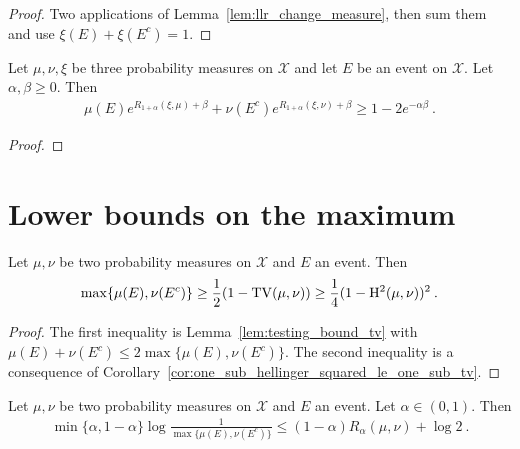 \begin{proof}
Two applications of Lemma~\ref{lem:llr_change_measure}, then sum them and use $\xi(E)+\xi(E^c) = 1$.
\end{proof}

\begin{lemma}
  \label{lem:renyi_change_measure_add}
  Let $\mu, \nu, \xi$ be three probability measures on $\mathcal X$ and let $E$ be an event on $\mathcal X$. Let $\alpha, \beta \ge 0$. Then
  \begin{align*}
  \mu(E) e^{R_{1+\alpha}(\xi, \mu) + \beta} + \nu(E^c) e^{R_{1+\alpha}(\xi, \nu) + \beta} \ge 1 - 2 e^{-\alpha \beta} \: .
  \end{align*}
\end{lemma}

\begin{proof}
\end{proof}


\section{Lower bounds on the maximum}

\begin{lemma}
  \label{lem:testing_bound_tv_hellinger_max}
  Let $\mu, \nu$ be two probability measures on $\mathcal X$ and $E$ an event. Then
  \begin{align*}
  \max\{\mu(E), \nu(E^c)\}
  \ge \frac{1}{2}(1 - \operatorname{TV}(\mu, \nu))
  \ge \frac{1}{4}(1 - \operatorname{H^2}(\mu, \nu))^2
  \: .
  \end{align*}
\end{lemma}

\begin{proof}
The first inequality is Lemma~\ref{lem:testing_bound_tv} with $\mu(E) + \nu(E^c) \le 2 \max\{\mu(E), \nu(E^c)\}$.
The second inequality is a consequence of Corollary~\ref{cor:one_sub_hellinger_squared_le_one_sub_tv}.
\end{proof}

\begin{lemma}
  \label{lem:testing_bound_renyi_max}
  Let $\mu, \nu$ be two probability measures on $\mathcal X$ and $E$ an event. Let $\alpha \in (0,1)$. Then
  \begin{align*}
  \min\{\alpha, 1 - \alpha\} \log\frac{1}{\max\{\mu(E), \nu(E^c)\}} \le (1 - \alpha) R_{\alpha}(\mu, \nu)  + \log 2 \: .
  \end{align*}
\end{lemma}

